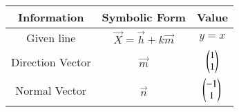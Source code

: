 \begin{tabular}{|c|c|c|}
	\hline
	Information&Symbolic Form & Value\\
	\hline
	Given line& $\vec{X}=\vec{h} + k\vec{m}$&$y=x$\\  
	\hline
	Direction Vector & $\vec{m}$ & $\begin{pmatrix}1\\1\end{pmatrix}$\\
	\hline
	Normal Vector& $\vec{n}$ & $\begin{pmatrix}-1\\1\end{pmatrix}$\\
	\hline
\end{tabular}

